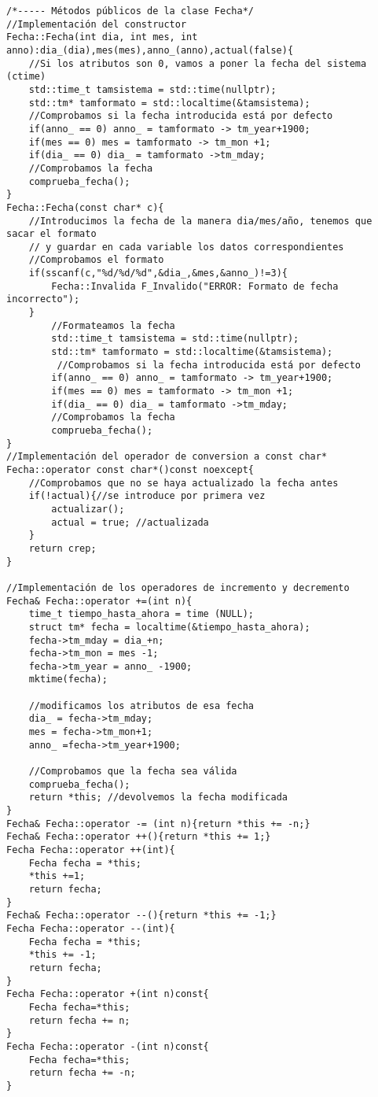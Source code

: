 \begin{verbatim}
/*----- Métodos públicos de la clase Fecha*/
//Implementación del constructor
Fecha::Fecha(int dia, int mes, int anno):dia_(dia),mes(mes),anno_(anno),actual(false){
    //Si los atributos son 0, vamos a poner la fecha del sistema (ctime)
    std::time_t tamsistema = std::time(nullptr);
    std::tm* tamformato = std::localtime(&tamsistema);
    //Comprobamos si la fecha introducida está por defecto
    if(anno_ == 0) anno_ = tamformato -> tm_year+1900;
    if(mes == 0) mes = tamformato -> tm_mon +1;
    if(dia_ == 0) dia_ = tamformato ->tm_mday;
    //Comprobamos la fecha
    comprueba_fecha();
}
Fecha::Fecha(const char* c){
    //Introducimos la fecha de la manera dia/mes/año, tenemos que sacar el formato
    // y guardar en cada variable los datos correspondientes
    //Comprobamos el formato
    if(sscanf(c,"%d/%d/%d",&dia_,&mes,&anno_)!=3){
        Fecha::Invalida F_Invalido("ERROR: Formato de fecha incorrecto");
    }
        //Formateamos la fecha
        std::time_t tamsistema = std::time(nullptr);
        std::tm* tamformato = std::localtime(&tamsistema);
         //Comprobamos si la fecha introducida está por defecto
        if(anno_ == 0) anno_ = tamformato -> tm_year+1900;
        if(mes == 0) mes = tamformato -> tm_mon +1;
        if(dia_ == 0) dia_ = tamformato ->tm_mday;
        //Comprobamos la fecha
        comprueba_fecha();
}
//Implementación del operador de conversion a const char*
Fecha::operator const char*()const noexcept{
    //Comprobamos que no se haya actualizado la fecha antes
    if(!actual){//se introduce por primera vez
        actualizar();
        actual = true; //actualizada
    }
    return crep;
}

//Implementación de los operadores de incremento y decremento
Fecha& Fecha::operator +=(int n){
    time_t tiempo_hasta_ahora = time (NULL);
	struct tm* fecha = localtime(&tiempo_hasta_ahora);
    fecha->tm_mday = dia_+n;
    fecha->tm_mon = mes -1;
    fecha->tm_year = anno_ -1900;
    mktime(fecha);

    //modificamos los atributos de esa fecha
    dia_ = fecha->tm_mday;
    mes = fecha->tm_mon+1;
    anno_ =fecha->tm_year+1900;
    
    //Comprobamos que la fecha sea válida
    comprueba_fecha();
    return *this; //devolvemos la fecha modificada
}
Fecha& Fecha::operator -= (int n){return *this += -n;}
Fecha& Fecha::operator ++(){return *this += 1;}
Fecha Fecha::operator ++(int){
    Fecha fecha = *this;
    *this +=1;
    return fecha;
}
Fecha& Fecha::operator --(){return *this += -1;}
Fecha Fecha::operator --(int){
    Fecha fecha = *this;
    *this += -1;
    return fecha;
}
Fecha Fecha::operator +(int n)const{
    Fecha fecha=*this;
    return fecha += n;
}
Fecha Fecha::operator -(int n)const{
    Fecha fecha=*this;
    return fecha += -n;
}



\end{verbatim}
